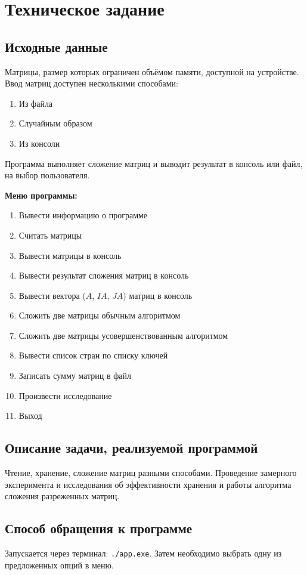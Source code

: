 \section{Техническое задание}

	\subsection{Исходные данные}
	Матрицы, размер которых ограничен объёмом памяти, доступной на устройстве. Ввод матриц доступен несколькими способами: 
	\begin{enumerate}
		\item Из файла
		\item Случайным образом 
		\item Из консоли
	\end{enumerate}
	Программа выполняет сложение матриц и выводит результат в консоль или файл, на выбор пользователя.\par
	
	\noindent\textbf{Меню программы:}
	\begin{enumerate}
		\item Вывести информацию о программе
		\item Считать матрицы
		\item Вывести матрицы в консоль
		\item Вывести результат сложения матриц в консоль
		\item Вывести вектора ($A$, $IA$, $JA$) матриц в консоль
		\item Сложить две матрицы обычным алгоритмом
		\item Сложить две матрицы усовершенствованным алгоритмом
		\item Вывести список стран по списку ключей
		\item Записать сумму матриц в файл
		\item Произвести исследование
		\item Выход
	\end{enumerate}
	
	\subsection{Описание задачи, реализуемой программой}
	Чтение, хранение, сложение матриц разными способами. Проведение замерного эксперимента и исследования об эффективности хранения и работы алгоритма сложения разреженных матриц.
	
	\subsection{Способ обращения к программе}
	Запускается через терминал: \texttt{./app.exe}. Затем необходимо выбрать одну из предложенных опций в меню.

